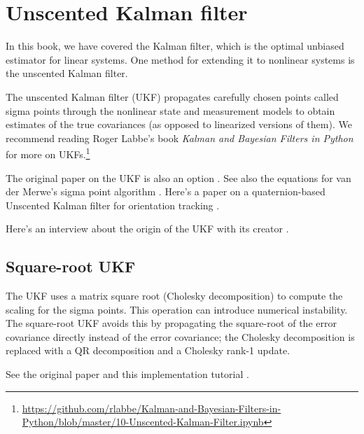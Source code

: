 \section{Unscented Kalman filter}
\label{sec:ukf}

In this book, we have covered the Kalman filter, which is the optimal unbiased
estimator for linear \glspl{system}. One method for extending it to nonlinear
systems is the unscented Kalman filter.

The unscented Kalman filter (UKF) propagates carefully chosen points called
sigma points through the nonlinear state and measurement models to obtain
estimates of the true covariances (as opposed to linearized versions of them).
We recommend reading Roger Labbe's book \textit{Kalman and Bayesian Filters in
Python} for more on
UKFs.\footnote{\url{https://github.com/rlabbe/Kalman-and-Bayesian-Filters-in-Python/blob/master/10-Unscented-Kalman-Filter.ipynb}}

The original paper on the UKF is also an option \cite{bib:ukf}. See also the
equations for van der Merwe's sigma point algorithm \cite{bib:ukf_sigma_points}.
Here's a paper on a quaternion-based Unscented Kalman filter for orientation
tracking \cite{bib:ukf_state_tracking}.

Here's an interview about the origin of the UKF with its creator
\cite{bib:first-hand_the_ut}.

\subsection{Square-root UKF}

The UKF uses a matrix square root (Cholesky decomposition) to compute the
scaling for the sigma points. This operation can introduce numerical
instability. The square-root UKF avoids this by propagating the square-root of
the error covariance directly instead of the error covariance; the Cholesky
decomposition is replaced with a QR decomposition and a Cholesky rank-1 update.

See the original paper \cite{bib:ukf_square_root} and this implementation
tutorial \cite{bib:ukf_square_root_tutorial}.
